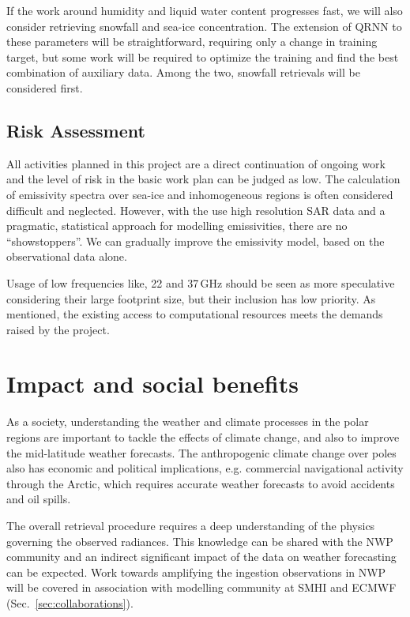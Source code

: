 \documentclass[12pt,oneside,a4paper]{article}
\begin{document}
If the work around humidity and liquid water content progresses fast, we will
also consider retrieving snowfall and sea-ice concentration. The extension of
QRNN to these parameters will be straightforward, requiring only a change in
training target, but some work will be required to optimize the training and
find the best combination of auxiliary data. Among the two, snowfall retrievals
will be considered first.
%
 
\subsection{Risk Assessment}
%
\label{sec:risk}
All activities planned in this project are a direct continuation of ongoing
work and the level of risk in the basic work plan can be judged as low. The
calculation of emissivity spectra over sea-ice and inhomogeneous regions is
often considered difficult and neglected. However, with the use high resolution SAR
data and a pragmatic, statistical approach for modelling emissivities,
there are no ``showstoppers''. We can gradually improve the emissivity model,
based on the observational data alone. 

Usage of low frequencies like, 22 and 37\,GHz should be seen as more
speculative considering their large footprint size, but their inclusion has low
priority. As mentioned, the existing access to computational resources meets
the demands raised by the project.


\section{Impact and social benefits}
%
\label{sec:impact}

As a society, understanding the weather and climate processes in the polar
regions are important to tackle the effects of climate change, and also to
improve the mid-latitude weather forecasts. The anthropogenic climate change over
poles also has economic and political implications, e.g. commercial
navigational activity through the Arctic, which requires accurate weather
forecasts to avoid accidents and oil spills.

The overall retrieval procedure requires a deep understanding of the physics
governing the observed radiances. This knowledge can be shared with the NWP community and an indirect significant impact of the data on weather forecasting can be expected. Work towards amplifying the ingestion observations in NWP will be covered in association with modelling community at SMHI and ECMWF (Sec.~\ref{sec:collaborations}).
\end{document}
